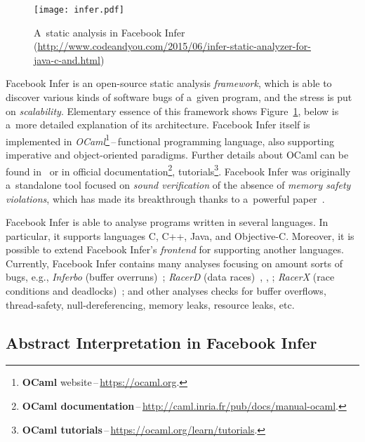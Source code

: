 \begin{figure}[hbt]
    \centering
    \texttt{[image: infer.pdf]}
    \caption{
        A~static analysis in Facebook Infer
        (\url{http://www.codeandyou.com/2015/06/infer-static-analyzer-for-java-c-and.html})
    }
    \label{fig:infer}
\end{figure}

Facebook Infer is an open-source static analysis \emph{framework},
which is able to discover various kinds of software bugs of a~given
program, and the stress is put on \emph{scalability}.
Elementary essence of this framework shows Figure~\ref{fig:infer}, below 
is a~more detailed explanation of its architecture. Facebook Infer
itself is implemented in \emph{OCaml}\footnote{\textbf{OCaml}
website\,--\,\url{https://ocaml.org}.}\,--\,functional programming
language, also supporting imperative and object-oriented paradigms. Further
details about OCaml can be found in~\cite{realWorldOCaml} or in
official documentation\footnote{\textbf{OCaml
documentation}\,--\,\url{http://caml.inria.fr/pub/docs/manual-ocaml}.},
tutorials\footnote{\textbf{OCaml
tutorials}\,--\,\url{https://ocaml.org/learn/tutorials}.}. Facebook Infer was
originally a~standalone tool focused on \emph{sound verification} of 
the absence of \emph{memory safety violations}, which has made its breakthrough 
thanks to a~powerful paper~\cite{inferBiabduction}.

Facebook Infer is able to analyse programs written in several languages.
In particular, it supports languages C, C++, Java, and Objective-C. Moreover,
it is possible to extend Facebook Infer's \emph{frontend} for supporting 
another languages. Currently, Facebook Infer contains many analyses focusing 
on amount sorts of bugs, e.g., \emph{Inferbo} (buffer 
overruns)~\cite{inferboOnline}; \emph{RacerD} (data races)~\cite{racerD},
\cite{racerDOnline}, \cite{staticRaceDetectorTruePositive}; \emph{RacerX}
(race conditions and deadlocks)~\cite{racerX}; and other analyses checks
for buffer overflows, thread-safety, null-dereferencing, memory leaks,
resource leaks, etc.


\subsection{Abstract Interpretation in Facebook Infer}

